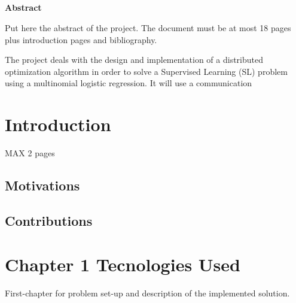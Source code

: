 \documentclass[a4paper,11pt,oneside]{book}
\begin{document}
\pagestyle{myheadings}



\newpage
\thispagestyle{empty}

\begin{center}
\chapter*{}
\thispagestyle{empty}
{\Huge \textbf{Abstract}}\\
\vspace{15mm}
\end{center}
Put here the abstract of the project. The document must be at most 18 pages plus
introduction pages and bibliography.

The project deals with the design and implementation of a distributed
optimization algorithm in order to solve a Supervised Learning (SL) problem using a multinomial logistic regression.
It will use a communication 


\tableofcontents \thispagestyle{empty}
\listoffigures\thispagestyle{empty}

\chapter*{Introduction}
MAX 2 pages
\section*{Motivations}
\section*{Contributions}

\chapter{Chapter 1 Tecnologies Used}
First-chapter for problem set-up and description of the implemented solution. 
\end{document}
